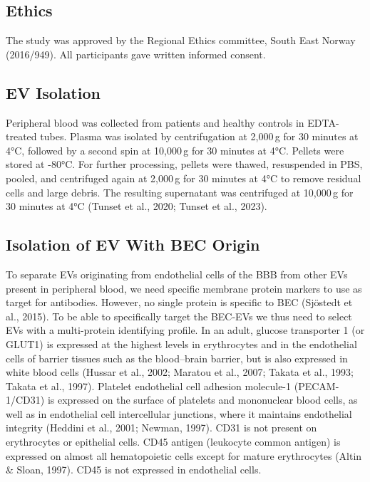 \documentclass[authordate, empirical, issue]{jote-new-article}
\begin{document}
	\subsection{Ethics}



	The study was approved by the Regional Ethics committee, South East Norway (2016/949). All participants gave written informed consent.







	\subsection{EV Isolation}



	Peripheral blood was collected from patients and healthy controls in EDTA-treated tubes. Plasma was isolated by centrifugation at 2,000 g for 30 minutes at 4°C, followed by a second spin at 10,000 g for 30 minutes at 4°C. Pellets were stored at -80°C. For further processing, pellets were thawed, resuspended in PBS, pooled, and centrifuged again at 2,000 g for 30 minutes at 4°C to remove residual cells and large debris. The resulting supernatant was centrifuged at 10,000 g for 30 minutes at 4°C (Tunset et al., 2020; Tunset et al., 2023).







	\subsection{Isolation of EV With BEC Origin }



	To separate EVs originating from endothelial cells of the BBB from other EVs present in peripheral blood, we need specific membrane protein markers to use as target for antibodies. However, no single protein is specific to BEC (Sjöstedt et al., 2015). To be able to specifically target the BEC-EVs we thus need to select EVs with a multi-protein identifying profile. In an adult, glucose transporter 1 (or GLUT1) is expressed at the highest levels in erythrocytes and in the endothelial cells of barrier tissues such as the blood--brain barrier, but is also expressed in white blood cells (Hussar et al., 2002; Maratou et al., 2007; Takata et al., 1993; Takata et al., 1997). Platelet endothelial cell adhesion molecule-1 (PECAM-1/CD31) is expressed on the surface of platelets and mononuclear blood cells, as well as in endothelial cell intercellular junctions, where it maintains endothelial integrity (Heddini et al., 2001; Newman, 1997). CD31 is not present on erythrocytes or epithelial cells. CD45 antigen (leukocyte common antigen) is expressed on almost all hematopoietic cells except for mature erythrocytes (Altin \& Sloan, 1997). CD45 is not expressed in endothelial cells.
\end{document}
